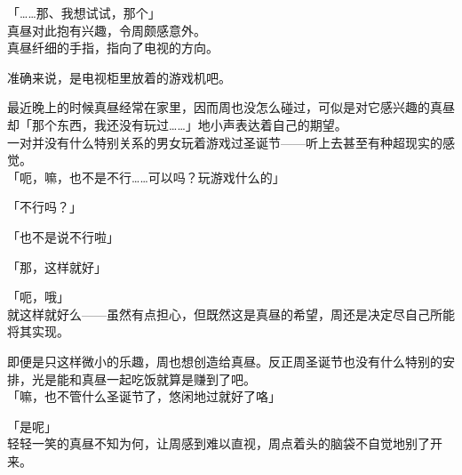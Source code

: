 「……那、我想试试，那个」\\

真昼对此抱有兴趣，令周颇感意外。\\

真昼纤细的手指，指向了电视的方向。

准确来说，是电视柜里放着的游戏机吧。

最近晚上的时候真昼经常在家里，因而周也没怎么碰过，可似是对它感兴趣的真昼却「那个东西，我还没有玩过……」地小声表达着自己的期望。\\

一对并没有什么特别关系的男女玩着游戏过圣诞节——听上去甚至有种超现实的感觉。\\

「呃，嘛，也不是不行……可以吗？玩游戏什么的」

「不行吗？」

「也不是说不行啦」

「那，这样就好」

「呃，哦」\\

就这样就好么——虽然有点担心，但既然这是真昼的希望，周还是决定尽自己所能将其实现。

即便是只这样微小的乐趣，周也想创造给真昼。反正周圣诞节也没有什么特别的安排，光是能和真昼一起吃饭就算是赚到了吧。\\

「嘛，也不管什么圣诞节了，悠闲地过就好了咯」

「是呢」\\

轻轻一笑的真昼不知为何，让周感到难以直视，周点着头的脑袋不自觉地别了开来。
